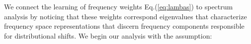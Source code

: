 \documentclass[sigconf,anonymous,review]{acmart}
\begin{document}
{\color{black}
We connect the learning of frequency weights Eq.(\ref{eq:lambas}) to spectrum analysis by noticing that these weights correspond eigenvalues that characterize frequency space representations that discern frequency components responsible for distributional shifts.
We begin our analysis with the assumption:
}
\end{document}

